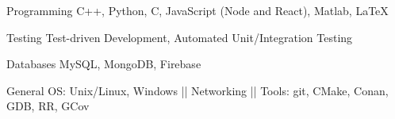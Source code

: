 

\begin{cvskills}

  \cvskill
    {Programming} %
	{C++, Python, C, JavaScript (Node and React), Matlab, LaTeX} %

  \cvskill
    {Testing} %
    {Test-driven Development, Automated Unit/Integration Testing} %

	\cvskill
    {Databases} %
	{MySQL, MongoDB, Firebase} %


  \cvskill
    {General} %
    {OS: Unix/Linux, Windows || Networking || Tools: git, CMake, Conan, GDB, RR, GCov} %



\end{cvskills}
